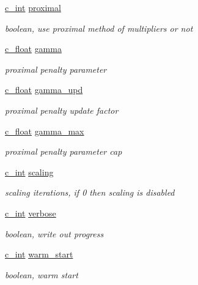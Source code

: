 \begin{DoxyCompactItemize}
\mbox{\hyperlink{global__opts_8h_aa3217a0f49d3e52b74e9dd830c44472f}{c\+\_\+int}} \mbox{\hyperlink{structQPALMSettings_a11c44b1eb59c00cb640da78d1606cdf5}{proximal}}
\begin{DoxyCompactList}\small\item\em boolean, use proximal method of multipliers or not \end{DoxyCompactList}\item 
\mbox{\hyperlink{global__opts_8h_a7f1a9fda95e52979658c20a0d134fb15}{c\+\_\+float}} \mbox{\hyperlink{structQPALMSettings_a6e6a16baafbbee10a6639afb52d244ff}{gamma}}
\begin{DoxyCompactList}\small\item\em proximal penalty parameter \end{DoxyCompactList}\item 
\mbox{\hyperlink{global__opts_8h_a7f1a9fda95e52979658c20a0d134fb15}{c\+\_\+float}} \mbox{\hyperlink{structQPALMSettings_a0053f0fe21f4ac5329ee49d937f645a2}{gamma\+\_\+upd}}
\begin{DoxyCompactList}\small\item\em proximal penalty update factor \end{DoxyCompactList}\item 
\mbox{\hyperlink{global__opts_8h_a7f1a9fda95e52979658c20a0d134fb15}{c\+\_\+float}} \mbox{\hyperlink{structQPALMSettings_a0ccd9f78a4d34dec26455c641734a394}{gamma\+\_\+max}}
\begin{DoxyCompactList}\small\item\em proximal penalty parameter cap \end{DoxyCompactList}\item 
\mbox{\hyperlink{global__opts_8h_aa3217a0f49d3e52b74e9dd830c44472f}{c\+\_\+int}} \mbox{\hyperlink{structQPALMSettings_abe76ae92171f3a1e5e4dcc934d797ac7}{scaling}}
\begin{DoxyCompactList}\small\item\em scaling iterations, if 0 then scaling is disabled \end{DoxyCompactList}\item 
\mbox{\hyperlink{global__opts_8h_aa3217a0f49d3e52b74e9dd830c44472f}{c\+\_\+int}} \mbox{\hyperlink{structQPALMSettings_a9ea17b9d594959ee2d589ef11ccd2dfd}{verbose}}
\begin{DoxyCompactList}\small\item\em boolean, write out progress \end{DoxyCompactList}\item 
\mbox{\hyperlink{global__opts_8h_aa3217a0f49d3e52b74e9dd830c44472f}{c\+\_\+int}} \mbox{\hyperlink{structQPALMSettings_a1e117619c60003cf492dc998af7ce16e}{warm\+\_\+start}}
\begin{DoxyCompactList}\small\item\em boolean, warm start \end{DoxyCompactList}\end{DoxyCompactItemize}



